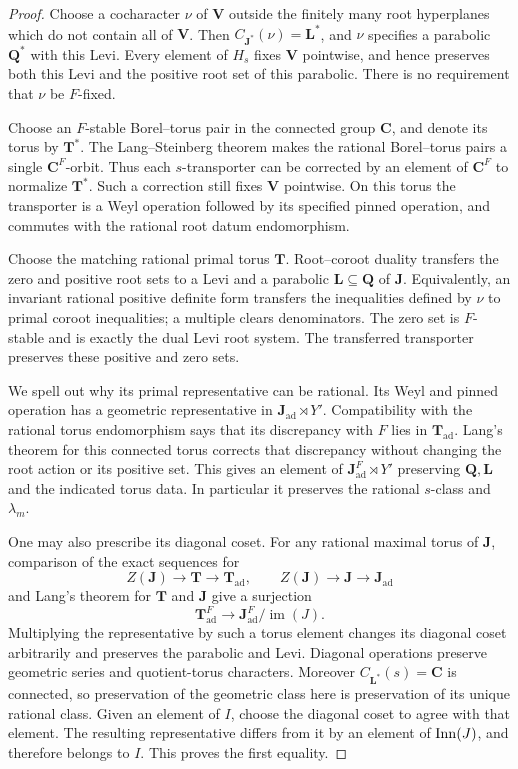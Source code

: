 \begin{proof}
Choose a cocharacter $\nu$ of $\mathbf V$ outside the finitely many
root hyperplanes which do not contain all of $\mathbf V$.  Then
$C_{\mathbf J^*}(\nu)=\mathbf L^*$, and $\nu$ specifies a parabolic
$\mathbf Q^*$ with this Levi.  Every element of $H_s$ fixes
$\mathbf V$ pointwise, and hence preserves both this Levi and the
positive root set of this parabolic.  There is no requirement that
$\nu$ be $F$-fixed.

Choose an $F$-stable Borel--torus pair in the connected group
$\mathbf C$, and denote its torus by $\mathbf T^*$.  The Lang--Steinberg theorem
\cite[Theorem~21.7]{MalleTesterman} makes the rational Borel--torus pairs a single $\mathbf C^F$-orbit.
Thus each $s$-transporter can be corrected by an element of
$\mathbf C^F$ to normalize $\mathbf T^*$.  Such a correction still
fixes $\mathbf V$ pointwise.  On this torus the transporter is a
Weyl operation followed by its specified pinned operation, and
commutes with the rational root datum endomorphism.

Choose the matching rational primal torus $\mathbf T$.  Root--coroot
duality transfers the zero and positive root sets to a Levi and a
parabolic $\mathbf L\subseteq\mathbf Q$ of $\mathbf J$.  Equivalently,
an invariant rational positive definite form transfers the
inequalities defined by $\nu$ to primal coroot inequalities; a
multiple clears denominators.  The zero set is $F$-stable and is
exactly the dual Levi root system.  The transferred transporter
preserves these positive and zero sets.

We spell out why its primal representative can be rational.  Its
Weyl and pinned operation has a geometric representative in
$\mathbf J_{\mathrm{ad}}\rtimes Y'$.  Compatibility with the rational
torus endomorphism says that its discrepancy with $F$ lies in
$\mathbf T_{\mathrm{ad}}$.  Lang's theorem for this connected torus
corrects that discrepancy without changing the root action or its
positive set.  This gives an element of
$\mathbf J_{\mathrm{ad}}^F\rtimes Y'$ preserving $\mathbf Q,\mathbf L$
and the indicated torus data.  In particular it preserves the
rational $s$-class and $\lambda_m$.

One may also prescribe its diagonal coset.  For any rational
maximal torus of $\mathbf J$, comparison of the exact sequences for
\[
 Z(\mathbf J)\longrightarrow\mathbf T\longrightarrow
 \mathbf T_{\mathrm{ad}},\qquad
 Z(\mathbf J)\longrightarrow\mathbf J\longrightarrow
 \mathbf J_{\mathrm{ad}}
\]
and Lang's theorem for $\mathbf T$ and $\mathbf J$ give a surjection
\[
 \mathbf T_{\mathrm{ad}}^F\longrightarrow
       \mathbf J_{\mathrm{ad}}^F/\operatorname{im}(J).
\]
Multiplying the representative by such a torus element changes its
diagonal coset arbitrarily and preserves the parabolic and Levi.
Diagonal operations preserve geometric series and quotient-torus
characters.  Moreover $C_{\mathbf L^*}(s)=\mathbf C$ is connected,
so preservation of the geometric class here is preservation of its
unique rational class.  Given an element of $I$, choose the diagonal
coset to agree with that element.  The resulting representative
differs from it by an element of $\operatorname{Inn}(J)$, and therefore belongs to
$I$.  This proves the first equality.


\end{proof}
